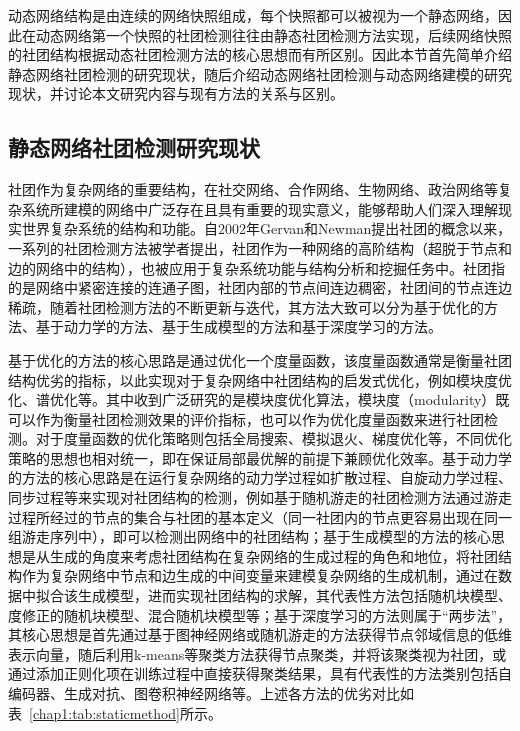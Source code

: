 动态网络结构是由连续的网络快照组成，每个快照都可以被视为一个静态网络，因此在动态网络第一个快照的社团检测往往由静态社团检测方法实现，后续网络快照的社团结构根据动态社团检测方法的核心思想而有所区别。因此本节首先简单介绍静态网络社团检测的研究现状，随后介绍动态网络社团检测与动态网络建模的研究现状，并讨论本文研究内容与现有方法的关系与区别。
\subsection{静态网络社团检测研究现状}
社团作为复杂网络的重要结构，在社交网络、合作网络、生物网络、政治网络等复杂系统所建模的网络中广泛存在且具有重要的现实意义，能够帮助人们深入理解现实世界复杂系统的结构和功能。自$2002$年Gervan和Newman提出社团的概念以来\cite{girvan2002community}，一系列的社团检测方法被学者提出，社团作为一种网络的高阶结构（超脱于节点和边的网络中的结构），也被应用于复杂系统功能与结构分析和挖掘任务中。社团指的是网络中紧密连接的连通子图，社团内部的节点间连边稠密，社团间的节点连边稀疏，随着社团检测方法的不断更新与迭代，其方法大致可以分为基于优化的方法、基于动力学的方法、基于生成模型的方法和基于深度学习的方法\cite{fortunato2016community,jin2021survey}。

基于优化的方法的核心思路是通过优化一个度量函数，该度量函数通常是衡量社团结构优劣的指标，以此实现对于复杂网络中社团结构的启发式优化，例如模块度优化、谱优化等。其中收到广泛研究的是模块度优化算法\cite{zhang2009modularity}，模块度（modularity）既可以作为衡量社团检测效果的评价指标，也可以作为优化度量函数来进行社团检测。对于度量函数的优化策略则包括全局搜索、模拟退火、梯度优化等\cite{zhang2014scalable,lee2012modularity,JSJA20241121007}，不同优化策略的思想也相对统一，即在保证局部最优解的前提下兼顾优化效率。基于动力学的方法的核心思路是在运行复杂网络的动力学过程如扩散过程\cite{jeub2015think}、自旋动力学过程\cite{traag2011narrow}、同步过程\cite{boccaletti2007detecting}等来实现对社团结构的检测，例如基于随机游走的社团检测方法\cite{pons2006computing,JSJA201912008}通过游走过程所经过的节点的集合与社团的基本定义（同一社团内的节点更容易出现在同一组游走序列中），即可以检测出网络中的社团结构；基于生成模型的方法的核心思想是从生成的角度来考虑社团结构在复杂网络的生成过程的角色和地位，将社团结构作为复杂网络中节点和边生成的中间变量来建模复杂网络的生成机制，通过在数据中拟合该生成模型，进而实现社团结构的求解，其代表性方法包括随机块模型\cite{snijders1997estimation}、度修正的随机块模型\cite{karrer2011stochastic}、混合随机块模型\cite{zhang2020struct}等；基于深度学习的方法则属于“两步法”，其核心思想是首先通过基于图神经网络或随机游走的方法获得节点邻域信息的低维表示向量，随后利用k-means等聚类方法获得节点聚类，并将该聚类视为社团，或通过添加正则化项在训练过程中直接获得聚类结果，具有代表性的方法类别包括自编码器\cite{sun2020network}、生成对抗\cite{zhang2020seal}、图卷积神经网络\cite{he2021community}等。上述各方法的优劣对比如表~\ref{chap1:tab:staticmethod}所示。

